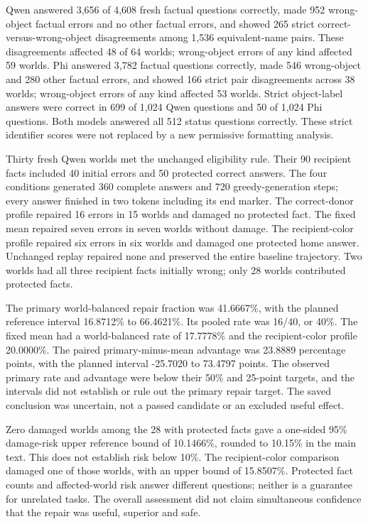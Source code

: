 \documentclass[10pt,letterpaper]{article}
\begin{document}
Qwen answered 3,656 of 4,608 fresh factual questions correctly, made 952 wrong-object factual errors and no other factual errors, and showed 265 strict correct-versus-wrong-object disagreements among 1,536 equivalent-name pairs. These disagreements affected 48 of 64 worlds; wrong-object errors of any kind affected 59 worlds. Phi answered 3,782 factual questions correctly, made 546 wrong-object and 280 other factual errors, and showed 166 strict pair disagreements across 38 worlds; wrong-object errors of any kind affected 53 worlds. Strict object-label answers were correct in 699 of 1,024 Qwen questions and 50 of 1,024 Phi questions. Both models answered all 512 status questions correctly. These strict identifier scores were not replaced by a new permissive formatting analysis.


Thirty fresh Qwen worlds met the unchanged eligibility rule. Their 90 recipient facts included 40 initial errors and 50 protected correct answers. The four conditions generated 360 complete answers and 720 greedy-generation steps; every answer finished in two tokens including its end marker. The correct-donor profile repaired 16 errors in 15 worlds and damaged no protected fact. The fixed mean repaired seven errors in seven worlds without damage. The recipient-color profile repaired six errors in six worlds and damaged one protected home answer. Unchanged replay repaired none and preserved the entire baseline trajectory. Two worlds had all three recipient facts initially wrong; only 28 worlds contributed protected facts.


The primary world-balanced repair fraction was 41.6667\%, with the planned reference interval 16.8712\% to 66.4621\%. Its pooled rate was 16/40, or 40\%. The fixed mean had a world-balanced rate of 17.7778\% and the recipient-color profile 20.0000\%. The paired primary-minus-mean advantage was 23.8889 percentage points, with the planned interval -25.7020 to 73.4797 points. The observed primary rate and advantage were below their 50\% and 25-point targets, and the intervals did not establish or rule out the primary repair target. The saved conclusion was uncertain, not a passed candidate or an excluded useful effect.


Zero damaged worlds among the 28 with protected facts gave a one-sided 95\% damage-risk upper reference bound of 10.1466\%, rounded to 10.15\% in the main text. This does not establish risk below 10\%. The recipient-color comparison damaged one of those worlds, with an upper bound of 15.8507\%. Protected fact counts and affected-world risk answer different questions; neither is a guarantee for unrelated tasks. The overall assessment did not claim simultaneous confidence that the repair was useful, superior and safe.
\end{document}
